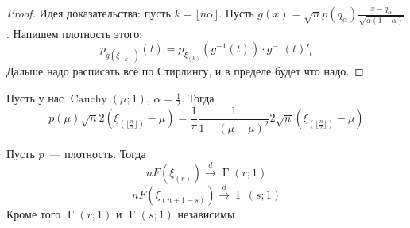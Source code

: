 \documentclass{article}
\begin{document}
    \begin{proof}
        Идея доказательства: пусть $k=\lfloor n\alpha\rfloor$. Пусть $g(x)=\sqrt np(q_\alpha)\frac{x-q_\alpha}{\sqrt{\alpha(1-\alpha)}}$. Напишем плотность этого:
        \[
        p_{g(\xi_{(k)})}(t)=p_{\xi_{(k)}}(g^{-1}(t))\cdot g^{-1}(t)'_t
        \]
        Дальше надо расписать всё по Стирлингу, и в пределе будет что надо.
    \end{proof}
    \begin{example}
        Пусть у нас $\operatorname{Cauchy}(\mu;1)$, $\alpha=\frac12$. Тогда
        \[
        p(\mu)\sqrt n2(\xi_{(\lfloor\frac n2\rfloor)}-\mu)=\frac1\pi\frac1{1+(\mu-\mu)^2}2\sqrt n(\xi_{(\lfloor\frac n2\rfloor)}-\mu)
        \]
    \end{example}
    \begin{theorem}
        Пусть $p$~--- плотность. Тогда
        \[
        nF(\xi_{(r)})\overset d\longrightarrow\operatorname{\Gamma}(r;1)
        \]
        \[
        nF(\xi_{(n+1-s)})\overset d\longrightarrow\operatorname{\Gamma}(s;1)
        \]
        Кроме того $\operatorname{\Gamma}(r;1)$ и $\operatorname{\Gamma}(s;1)$ независимы
    \end{theorem}
\end{document}
